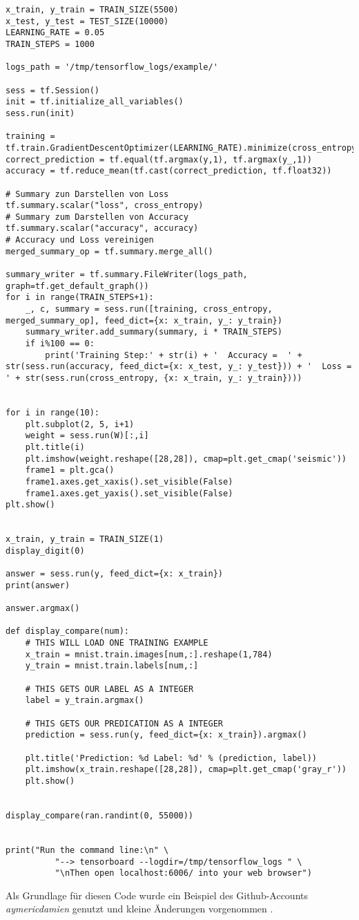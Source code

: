 \begin{lstlisting}
x_train, y_train = TRAIN_SIZE(5500)
x_test, y_test = TEST_SIZE(10000)
LEARNING_RATE = 0.05
TRAIN_STEPS = 1000

logs_path = '/tmp/tensorflow_logs/example/'

sess = tf.Session()
init = tf.initialize_all_variables()
sess.run(init)

training = tf.train.GradientDescentOptimizer(LEARNING_RATE).minimize(cross_entropy)
correct_prediction = tf.equal(tf.argmax(y,1), tf.argmax(y_,1))
accuracy = tf.reduce_mean(tf.cast(correct_prediction, tf.float32))

# Summary zun Darstellen von Loss
tf.summary.scalar("loss", cross_entropy)
# Summary zum Darstellen von Accuracy
tf.summary.scalar("accuracy", accuracy)
# Accuracy und Loss vereinigen
merged_summary_op = tf.summary.merge_all()

summary_writer = tf.summary.FileWriter(logs_path, graph=tf.get_default_graph())
for i in range(TRAIN_STEPS+1):
    _, c, summary = sess.run([training, cross_entropy, merged_summary_op], feed_dict={x: x_train, y_: y_train})
    summary_writer.add_summary(summary, i * TRAIN_STEPS)
    if i%100 == 0:
        print('Training Step:' + str(i) + '  Accuracy =  ' + str(sess.run(accuracy, feed_dict={x: x_test, y_: y_test})) + '  Loss = ' + str(sess.run(cross_entropy, {x: x_train, y_: y_train})))
    

for i in range(10):
    plt.subplot(2, 5, i+1)
    weight = sess.run(W)[:,i]
    plt.title(i)
    plt.imshow(weight.reshape([28,28]), cmap=plt.get_cmap('seismic'))
    frame1 = plt.gca()
    frame1.axes.get_xaxis().set_visible(False)
    frame1.axes.get_yaxis().set_visible(False) 
plt.show()


x_train, y_train = TRAIN_SIZE(1) 
display_digit(0)

answer = sess.run(y, feed_dict={x: x_train})
print(answer)

answer.argmax()

def display_compare(num):
    # THIS WILL LOAD ONE TRAINING EXAMPLE
    x_train = mnist.train.images[num,:].reshape(1,784)
    y_train = mnist.train.labels[num,:]
    
    # THIS GETS OUR LABEL AS A INTEGER
    label = y_train.argmax()
    
    # THIS GETS OUR PREDICATION AS A INTEGER
    prediction = sess.run(y, feed_dict={x: x_train}).argmax() 
    
    plt.title('Prediction: %d Label: %d' % (prediction, label))
    plt.imshow(x_train.reshape([28,28]), cmap=plt.get_cmap('gray_r'))
    plt.show()
    

display_compare(ran.randint(0, 55000))


print("Run the command line:\n" \
          "--> tensorboard --logdir=/tmp/tensorflow_logs " \
          "\nThen open localhost:6006/ into your web browser")
\end{lstlisting}
Als Grundlage für diesen Code wurde ein Beispiel des Github-Accounts \textit{aymericdamien} genutzt und kleine Änderungen vorgenommen \citep{Demonstrator}. 